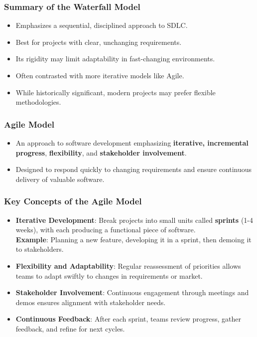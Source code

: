 \documentclass{beamer}
\begin{document}
\begin{frame}[fragile]
    \frametitle{Summary of the Waterfall Model}
    \begin{itemize}
        \item Emphasizes a sequential, disciplined approach to SDLC.
        \item Best for projects with clear, unchanging requirements.
        \item Its rigidity may limit adaptability in fast-changing environments.
        \item Often contrasted with more iterative models like Agile.
        \item While historically significant, modern projects may prefer flexible methodologies.
    \end{itemize}
\end{frame}

\begin{frame}[fragile]
  \frametitle{Agile Model}
  \begin{itemize}
    \item An approach to software development emphasizing \textbf{iterative, incremental progress}, \textbf{flexibility}, and \textbf{stakeholder involvement}.
    \item Designed to respond quickly to changing requirements and ensure continuous delivery of valuable software.
  \end{itemize}
\end{frame}

\begin{frame}[fragile]
  \frametitle{Key Concepts of the Agile Model}
  \begin{itemize}
    \item \textbf{Iterative Development}: Break projects into small units called \textbf{sprints} (1-4 weeks), with each producing a functional piece of software. \\
    \textbf{Example}: Planning a new feature, developing it in a sprint, then demoing it to stakeholders.
    \item \textbf{Flexibility and Adaptability}: Regular reassessment of priorities allows teams to adapt swiftly to changes in requirements or market.
    \item \textbf{Stakeholder Involvement}: Continuous engagement through meetings and demos ensures alignment with stakeholder needs.
    \item \textbf{Continuous Feedback}: After each sprint, teams review progress, gather feedback, and refine for next cycles.
  \end{itemize}
\end{frame}
\end{document}
